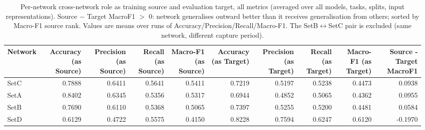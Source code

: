 \begin{table}
\caption{Per-network cross-network role as training source and evaluation target, all metrics (averaged over all models, tasks, splits, input representations). Source $-$ Target MacroF1 $>$ 0: network generalises outward better than it receives generalisation from others; sorted by Macro-F1 source rank. Values are means over runs of Accuracy/Precision/Recall/Macro-F1. The SetB$\leftrightarrow$SetC pair is excluded (same network, different capture period).}
\label{tab:q4_appendix_source_target}
\begin{tabular}{lrrrrrrrrr}
\toprule
Network & Accuracy (as Source) & Precision (as Source) & Recall (as Source) & Macro-F1 (as Source) & Accuracy (as Target) & Precision (as Target) & Recall (as Target) & Macro-F1 (as Target) & Source - Target MacroF1 \\
\midrule
SetC & 0.7888 & 0.6411 & 0.5641 & 0.5411 & 0.7219 & 0.5197 & 0.5238 & 0.4473 & 0.0938 \\
SetA & 0.8402 & 0.6345 & 0.5356 & 0.5317 & 0.6944 & 0.4852 & 0.5065 & 0.4362 & 0.0955 \\
SetB & 0.7690 & 0.6110 & 0.5368 & 0.5065 & 0.7397 & 0.5255 & 0.5200 & 0.4481 & 0.0584 \\
SetD & 0.6129 & 0.4722 & 0.5575 & 0.4150 & 0.8228 & 0.7594 & 0.6247 & 0.6120 & -0.1970 \\
\bottomrule
\end{tabular}
\end{table}
